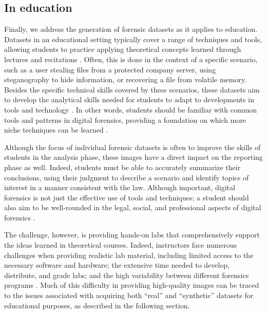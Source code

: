 \documentclass[letterpaper,12pt]{report}
\begin{document}
\subsection{In education}\label{in-education}

Finally, we address the generation of forensic datasets as it applies to
education. Datasets in an educational setting typically cover a range of
techniques and tools, allowing students to practice applying theoretical
concepts learned through lectures and recitations
\cite{adelsteinAutomaticallyCreatingRealistic2005}. Often, this is
done in the context of a specific scenario, such as a user stealing
files from a protected company server, using steganography to hide
information, or recovering a file from volatile memory. Besides the
specific technical skills covered by these scenarios, these datasets aim
to develop the analytical skills needed for students to adapt to
developments in tools and technology
\cite{cooperStandardsDigitalForensics2010}. In other words, students
should be familiar with common tools and patterns in digital forensics,
providing a foundation on which more niche techniques can be learned
\cite{lawrenceFrameworkDesignWebbased2009}.

Although the focus of individual forensic datasets is often to improve
the skills of students in the analysis phase, these images have a direct
impact on the reporting phase as well. Indeed, students must be able to
accurately summarize their conclusions, using their judgment to describe
a scenario and identify topics of interest in a manner consistent with
the law. Although important, digital forensics is not just the effective
use of tools and techniques; a student should also aim to be
well-rounded in the legal, social, and professional aspects of digital
forensics \cite{andersonComparativeStudyTeaching2006}.

The challenge, however, is providing hands-on labs that comprehensively
support the ideas learned in theoretical courses. Indeed, instructors
face numerous challenges when providing realistic lab material,
including limited access to the necessary software and hardware; the
extensive time needed to develop, distribute, and grade labs; and the
high variability between different forensics programs
\cite{adelsteinAutomaticallyCreatingRealistic2005,guptaDigitalForensicsLab2022,lawrenceFrameworkDesignWebbased2009}.
Much of this difficulty in providing high-quality images can be traced
to the issues associated with acquiring both ``real'' and ``synthetic''
datasets for educational purposes, as described in the following
section.
\end{document}
